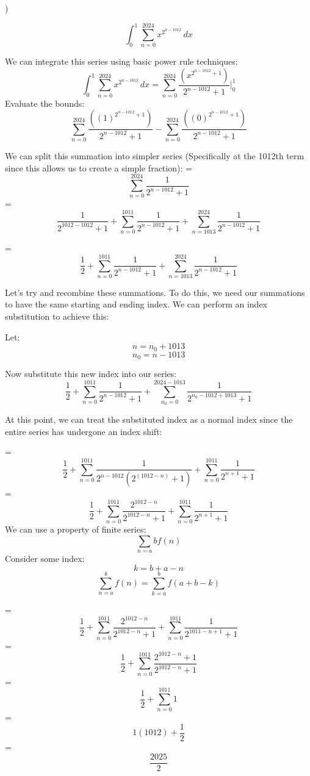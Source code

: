 \documentclass{article}
\begin{document}
)
\begin{flushleft}
\[\int_{0}^{1} \sum_{n=0}^{2024} x^{2^{n-1012}}\,dx\]

\noindent We can integrate this series using basic power rule techniques:
\[\int_{0}^{1} \sum_{n=0}^{2024}x^{2^{n-1012}}\,dx = \sum_{n=0}^{2024}\frac{\left(x^{2^{n-1012}+1}\right)}{2^{n-1012}+1} \Big|_{0}^{1}\]
\noindent Evaluate the bounds:
\[\sum_{n=0}^{2024}\frac{\left(\left(1\right)^{2^{n-1012}+1}\right)}{2^{n-1012}+1}-\sum_{n=0}^{2024}\frac{\left(\left(0\right)^{2^{n-1012}+1}\right)}{2^{n-1012}+1}\]

\noindent We can split this summation into simpler series (Specifically at the 1012th term since this allows us to create a simple fraction):
=\[\sum_{n=0}^{2024}\frac{1}{2^{n-1012}+1}\]
=\[\frac{1}{2^{1012-1012}+1}+\sum_{n=0}^{1011}\frac{1}{2^{n-1012}+1}+\sum_{n=1013}^{2024}\frac{1}{2^{n-1012}+1}\]

=\[\frac{1}{2}+\sum_{n=0}^{1011}\frac{1}{2^{n-1012}+1}+\sum_{n=1013}^{2024}\frac{1}{2^{n-1012}+1}\]


\noindent Let's try and recombine these summations. To do this, we need our summations to have the same starting and ending index. We can perform an index substitution to achieve this:

\noindent Let: \[n = n_0 + 1013\]
\[n_{0}=n-1013\]

\noindent Now substitute this new index into our series:
\[\frac{1}{2}+\sum_{n=0}^{1011}\frac{1}{2^{n-1012}+1}+\sum_{n_0=0}^{2024-1013}\frac{1}{2^{n_0-1012+1013}+1}\]

\noindent At this point, we can treat the substituted index as a normal index since the entire series has undergone an index shift:

=\[\frac{1}{2}+\sum_{n=0}^{1011}\frac{1}{2^{n-1012}\left(2^{\left(1012-n\right)}+1\right)}+\sum_{n=0}^{1011}\frac{1}{2^{n+1}+1}\]
=\[\frac{1}{2}+\sum_{n=0}^{1011}\frac{2^{1012-n}}{2^{1012-n}+1}+\sum_{n=0}^{1011}\frac{1}{2^{n+1}+1}\]
\noindent We can use a property of finite series:
\[\sum_{n=a}{b}f(n)\]
\noindent Consider some index:
\[k = b+a-n\]
\[\sum_{n=a}^{b}f(n) = \sum_{k=a}^{b}f(a+b-k)\]

=\[\frac{1}{2}+\sum_{n=0}^{1011}\frac{2^{1012-n}}{2^{1012-n}+1}+\sum_{n=0}^{1011}\frac{1}{2^{1011-n+1}+1}\]
=\[\frac{1}{2}+\sum_{n=0}^{1011}\frac{2^{1012-n}+1}{2^{1012-n}+1}\]
=\[\frac{1}{2}+\sum_{n=0}^{1011}1\]
=\[1\left(1012\right)+\frac{1}{2}\]
=\[\boxed{\frac{2025}{2}}\]
\end{flushleft}
\end{document}
